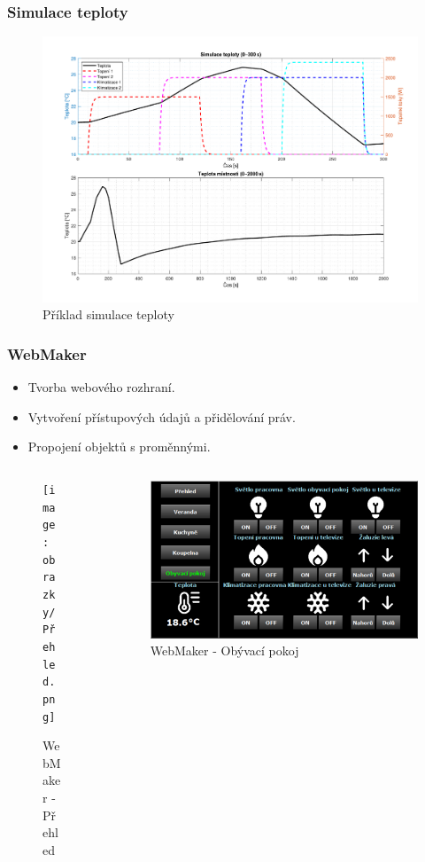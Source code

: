 \documentclass[%
  12pt,       				%
	t,                  %
	aspectratio=1610,   %
	unicode,						%
]{beamer}				    	%
\begin{document}
\begin{frame}
	\frametitle{Simulace teploty}
	\begin{figure} [!ht]	
		\centering              %
		\includegraphics[width=0.65\columnwidth]{obrazky/simulace_teploty_kuchyne.pdf}
		\caption{Příklad simulace teploty}
	\end{figure}										%
\end{frame}

\begin{frame} 
	\frametitle{WebMaker}
	\begin{itemize}
		\item Tvorba webového rozhraní.
		\item Vytvoření přístupových údajů a přidělování práv.
		\item Propojení objektů s proměnnými.
	\end{itemize}
	\begin{columns}
		\begin{column}{0.5\textwidth}
			\begin{figure} [!ht]	
				\centering
				\texttt{[image: obrazky/Přehled.png]}
				\caption{WebMaker - Přehled}
			\end{figure}	
		\end{column}
		\begin{column}{0.5\textwidth}
			\begin{figure} [!ht]	
				\centering
				\includegraphics[width=1\columnwidth]{obrazky/Obyvaci_pokoj.png}
				\caption{WebMaker - Obývací pokoj}
			\end{figure}
		\end{column}
	\end{columns}
\end{frame}
\end{document}
